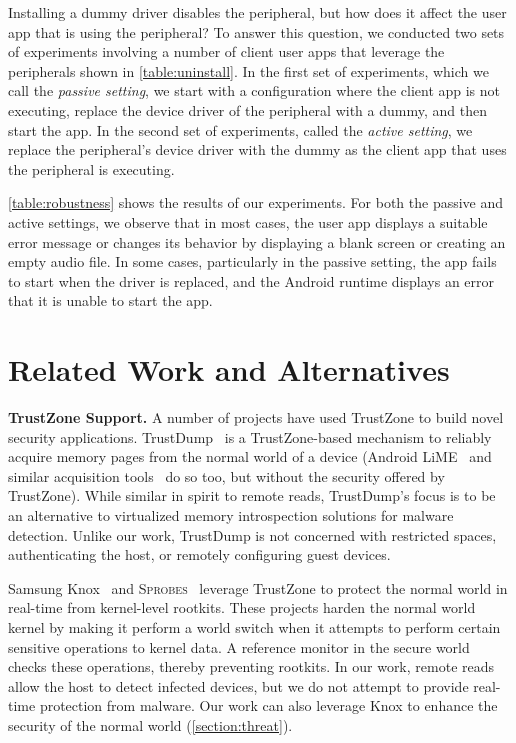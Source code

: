 \documentclass[pageno]{sig-alternate-05-2015}
\newcommand{\figref}[1]{\autoref{#1}}
\newcommand{\mysection}[1]{\section{#1}}
\newcommand{\sectref}[1]{\autoref{#1}}
\newcommand{\myparagraph}[1]{\indent\par\noindent\textsf{\textbf{#1.}}}
\begin{document}
Installing a dummy driver disables the peripheral, but how does it affect the
user app that is using the peripheral? To answer this question, we conducted
two sets of experiments involving a number of client user apps that leverage
the peripherals shown in \figref{table:uninstall}.  In the first set of
experiments, which we call the \textit{passive setting}, we start with a
configuration where the client app is not executing, replace the device driver
of the peripheral with a dummy, and then start the app. In the second set of
experiments, called the \textit{active setting}, we replace the peripheral's
device driver with the dummy as the client app that uses the peripheral is
executing. 

\figref{table:robustness} shows the results of our experiments. For both the
passive and active settings, we observe that in most cases, the user app
displays a suitable error message or changes its behavior by displaying a blank
screen or creating an empty audio file. In some cases, particularly in the
passive setting, the app fails to start when the driver is replaced, and the
Android runtime displays an error that it is unable to start the app.


% 

\mysection{Related Work and Alternatives}
\label{section:related}

\myparagraph{TrustZone Support}
%
A number of projects have used TrustZone to build novel security applications.
TrustDump~\cite{trustdump:esorics14} is a TrustZone-based mechanism to reliably
acquire memory pages from the normal world of a device (Android
LiME~\cite{lime} and similar acquisition tools~\cite{dmd,ddms,recoverymode} do
so too, but without the security offered by TrustZone).  While similar in
spirit to remote reads, TrustDump's focus is to be an alternative to
virtualized memory introspection solutions for malware detection. Unlike our
work, TrustDump is not concerned with restricted spaces, authenticating the
host, or remotely configuring guest devices.

Samsung Knox~\cite{knox:ccs14} and \textsc{Sprobes}~\cite{sprobes:most14}
leverage TrustZone to protect the normal world in real-time from kernel-level
rootkits. These projects harden the normal world kernel by making it perform a
world switch when it attempts to perform certain sensitive operations to kernel
data. A reference monitor in the secure world checks these operations, thereby
preventing rootkits. In our work, remote reads allow the host to detect
infected devices, but we do not attempt to provide real-time protection from
malware. Our work can also leverage Knox to enhance the security of the normal
world (\sectref{section:threat}).
\end{document}
